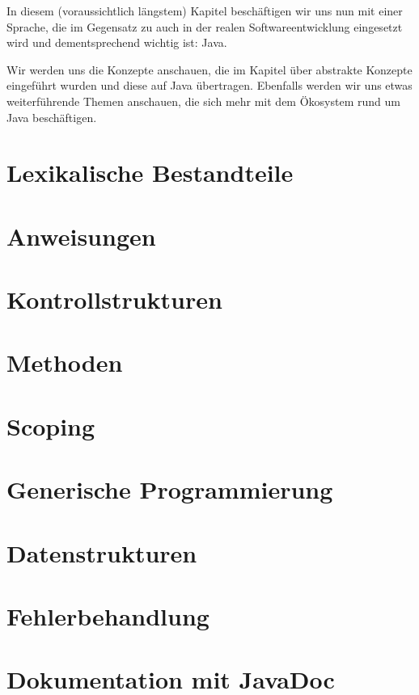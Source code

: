 In diesem (voraussichtlich längstem) Kapitel beschäftigen wir uns nun mit einer Sprache, die im Gegensatz zu \racket auch in der realen Softwareentwicklung eingesetzt wird und dementsprechend wichtig ist: Java.

Wir werden uns die Konzepte anschauen, die im Kapitel über abstrakte Konzepte eingeführt wurden und diese auf Java übertragen. Ebenfalls werden wir uns etwas weiterführende Themen anschauen, die sich mehr mit dem Ökosystem rund um Java beschäftigen. 

\section{Lexikalische Bestandteile}
	

\section{Anweisungen}
	

\section{Kontrollstrukturen}
	

\section{Methoden}
	

\section{Scoping}
	

\section{Generische Programmierung}
	

\section{Datenstrukturen}
	

\section{Fehlerbehandlung}
	

\section{Dokumentation mit JavaDoc}
	
